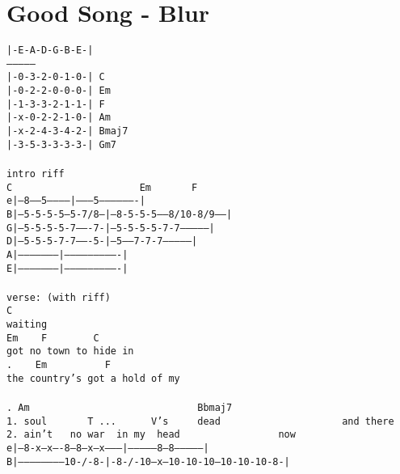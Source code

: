 \newpage
\section{Good Song - Blur}
\label{Good Song - Blur}
\texttt{|-E-A-D-G-B-E-|\\
---------------\\
|-0-3-2-0-1-0-|\ C\\
|-0-2-2-0-0-0-|\ Em\\
|-1-3-3-2-1-1-|\ F\\
|-x-0-2-2-1-0-|\ Am\\
|-x-2-4-3-4-2-|\ Bmaj7\\
|-3-5-3-3-3-3-|\ Gm7\\
\\
intro\ riff\\
C\ \ \ \ \ \ \ \ \ \ \ \ \ \ \ \ \ \ \ \ \ \ Em\ \ \ \ \ \ \ F\\
e|--8-----5-----------|--------5-------------------|\\
B|--5-5-5-5---5-7/8---|--8-5-5-5-----8/10-8/9------|\\
G|--5-5-5-5-7-------7-|--5-5-5-5-7-7---------------|\\
D|--5-5-5-7-7-------5-|--5-----7-7-7---------------|\\
A|--------------------|----------------------------|\\
E|--------------------|----------------------------|\\
\\
verse:\ (with\ riff)\\
C\\
waiting\\
Em\ \ \ \ F\ \ \ \ \ \ \ \ C\\
got\ no\ town\ to\ hide\ in\ \ \ \ \ \\
.\ \ \ \ Em\ \ \ \ \ \ \ \ \ \ F\\
the\ country's\ got\ a\ hold\ of\ my\\
\\
.\ Am\ \ \ \ \ \ \ \ \ \ \ \ \ \ \ \ \ \ \ \ \ \ \ \ \ \ \ \ \ Bbmaj7\\
1.\ soul\ \ \ \ \ \ \ T\ ...\ \ \ \ \ \ V's\ \ \ \ \ dead\ \ \ \ \ \ \ \ \ \ \ \ \ \ \ \ \ \ \ \ \ and\ there\\
2.\ ain't\ \ \ no\ war\ \ in\ my\ \ head\ \ \ \ \ \ \ \ \ \ \ \ \ \ \ \ \ now\ \ \\
e|--8-x--x----8--8--x--x--------|---------------8--8--------------|\\
B|-----------------------10-/-8-|-8-/-10--x--10-10-10--10-10-10-8-|\\
}
